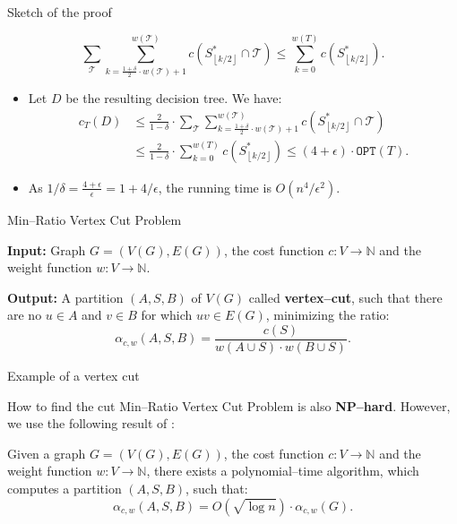 \documentclass{beamer}
\newcommand{\br}[1]{\mathopen{}\left( #1 \right)}
\newcommand{\fl}[1]{\mathopen{}\left\lfloor #1 \right\rfloor}
\newcommand{\OPT}{\texttt{OPT}}
\begin{document}
\begin{frame}{Sketch of the proof}
    \begin{lemma}\label{up_trees}
            $$\sum_{\mathcal{T}}\sum_{k=\frac{1+\delta}{2}\cdot w\br{\mathcal{T}}+1}^{w\br{\mathcal{T}}}c\br{S_{\fl{k/2}}^*\cap \mathcal{T}}\leq \sum_{k=0}^{w\br{T}}c\br{S_{\fl{k/2}}^*}.$$
            \end{lemma}
    \begin{itemize}
    \item Let $D$ be the resulting decision tree. We have:
    \begin{align*}
            c_T\br{D} &\leq 
            \frac{2}{1-\delta}\cdot\sum_{\mathcal{T}}\sum_{k=\frac{1+\delta}{2}\cdot w\br{\mathcal{T}}+1}^{w\br{\mathcal{T}}}c\br{S_{\fl{k/2}}^*\cap \mathcal{T}}\\
            &\leq \frac{2}{1-\delta}\cdot\sum_{k=0}^{w\br{T}}c\br{S_{\fl{k/2}}^*}\leq  \br{4+\epsilon}\cdot\OPT\br{T}.
    \end{align*}
    \item As $1/\delta=\frac{4+\epsilon}{\epsilon}=1+4/\epsilon$, the running time is $O\br{n^4/\epsilon^2}$.
    \end{itemize}
\end{frame}



\begin{frame}{Min–Ratio Vertex Cut Problem}

\begin{tcolorbox}[colback=white, title= Min–Ratio Vertex Cut Problem, fonttitle=\bfseries, breakable]
\textbf{Input:} Graph $G=\br{V\br{G}, E\br{G}}$, the cost function $c\colon V\to \mathbb{N}$ and the weight function $w\colon V\to \mathbb{N}$.

\pause
\textbf{Output:} A partition $\br{A,S,B}$ of $V\br{G}$ called \textbf{vertex–cut}, such that there are no $u\in A$ and $v\in B$ for which $uv\in E\br{G}$, minimizing the ratio:
$$
\alpha_{c,w}\br{A,S,B}=\frac{c\br{S}}{w\br{A\cup S}\cdot w\br{B\cup S}}.
$$
\end{tcolorbox}
\end{frame}


\begin{frame}{Example of a vertex cut}
    
\end{frame}

\begin{frame}{How to find the cut}
Min–Ratio Vertex Cut Problem is also \textbf{NP–hard}. However, we use the following result of \cite{Improvedapproximationalgorithmsvertexseparators}:
\begin{theorem}\label{approxmrvc}
    Given a graph $G=\br{V\br{G}, E\br{G}}$, the cost function $c:V\to\mathbb{N}$ and the weight function $w:V\to \mathbb{N}$, there exists a
polynomial–time algorithm, which computes a partition $(A, S, B)$, such that:
$$
\alpha_{c,w}\br{A,S,B}=O\br{\sqrt{\log n
}}\cdot\alpha_{c,w}\br{G}.
$$
\end{theorem}
\end{frame}
\end{document}
